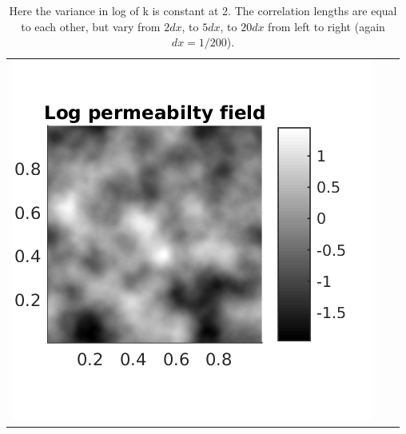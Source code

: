 \documentclass{article}
\begin{document}
\begin{table}[!h]
\begin{tabular}{c c c}
\includegraphics[scale=0.75]{figs/kfield_2_005_005.png}
\end{tabular}
\caption{Here the variance in log of k is constant at 2. The correlation lengths are equal to each other, but vary from $2dx$, to $5 dx$, to $20dx$ from left to right (again $dx = 1/200$).}
\end{table}


% 
\end{document}
